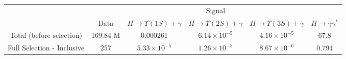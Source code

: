 

\begin{tabular}{c|c|c|c|c|c}
\hline
\hline

&  &  \multicolumn{3}{c|}{Signal} &    \\
\cline{3-5}
& Data & $H \rightarrow \Upsilon(1S)+\gamma$ & $H \rightarrow \Upsilon(2S)+\gamma$ & $H \rightarrow \Upsilon(3S)+\gamma$ &  $H \rightarrow \gamma\gamma^{*}$  \\
\hline
Total (before selection) & 169.84 M &  0.000261 & $6.14 \times 10^{-5}$ & $4.16 \times 10^{-5}$ & 67.8  \\
\hline\hline
Full Selection - Inclusive & 257  &  $5.33 \times 10^{-5}$ &  $1.26 \times 10^{-5}$ &  $8.67 \times 10^{-6}$ &  0.794  \\

\end{tabular}

